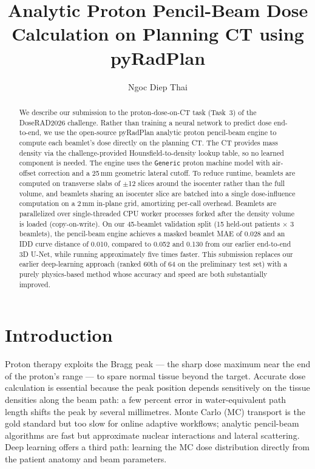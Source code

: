 \documentclass[runningheads]{llncs}
\begin{document}
\title{Analytic Proton Pencil-Beam Dose Calculation on Planning CT using pyRadPlan}

\author{Ngoc Diep Thai}

\maketitle

\begin{abstract}
We describe our submission to the proton-dose-on-CT task (Task~3) of the DoseRAD2026 challenge. Rather than training a neural network to predict dose end-to-end, we use the open-source pyRadPlan analytic proton pencil-beam engine to compute each beamlet's dose directly on the planning CT. The CT provides mass density via the challenge-provided Hounsfield-to-density lookup table, so no learned component is needed. The engine uses the \texttt{Generic} proton machine model with air-offset correction and a 25\,mm geometric lateral cutoff. To reduce runtime, beamlets are computed on transverse slabs of $\pm$12 slices around the isocenter rather than the full volume, and beamlets sharing an isocenter slice are batched into a single dose-influence computation on a 2\,mm in-plane grid, amortizing per-call overhead. Beamlets are parallelized over single-threaded CPU worker processes forked after the density volume is loaded (copy-on-write). On our 45-beamlet validation split (15 held-out patients $\times$ 3 beamlets), the pencil-beam engine achieves a masked beamlet MAE of 0.028 and an IDD curve distance of 0.010, compared to 0.052 and 0.130 from our earlier end-to-end 3D U-Net, while running approximately five times faster. This submission replaces our earlier deep-learning approach (ranked 60th of 64 on the preliminary test set) with a purely physics-based method whose accuracy and speed are both substantially improved.
\end{abstract}

\section{Introduction}
Proton therapy exploits the Bragg peak --- the sharp dose maximum near the end of the proton's range --- to spare normal tissue beyond the target. Accurate dose calculation is essential because the peak position depends sensitively on the tissue densities along the beam path: a few percent error in water-equivalent path length shifts the peak by several millimetres. Monte Carlo (MC) transport is the gold standard but too slow for online adaptive workflows; analytic pencil-beam algorithms are fast but approximate nuclear interactions and lateral scattering. Deep learning offers a third path: learning the MC dose distribution directly from the patient anatomy and beam parameters.
\end{document}
